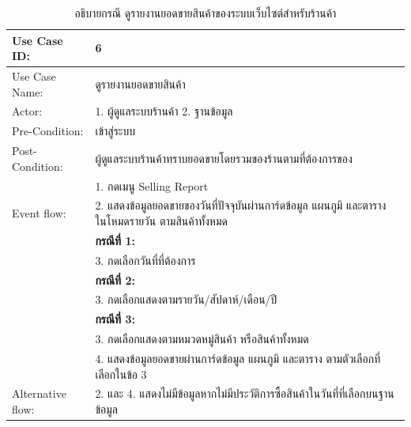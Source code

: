 \begin{table}[htbp]
  \centering
  \caption{อธิบายกรณี ดูรายงานยอดขายสินค้าของระบบเว็บไซต์สำหรับร้านค้า}
  \begin{tabularx}{\textwidth}{|p{3cm}|X|}
    \hline
    \multirow{1}{3cm}{Use Case ID:}      & 6                                                                               \\
    \hline
    \multirow{1}{3cm}{Use Case Name:}    & ดูรายงานยอดขายสินค้า                                                               \\
    \hline
    \multirow{1}{3cm}{Actor:}            & 1. ผู้ดูแลระบบร้านค้า  2. ฐานข้อมูล                                                    \\
    \hline
    \multirow{1}{3cm}{Pre-Condition:}    & เข้าสู่ระบบ                                                                        \\
    \hline
    \multirow{1}{3cm}{Post-Condition:}   & ผู้ดูแลระบบร้านค้าทราบยอดขายโดยรวมของร้านตามที่ต้องการของ                                \\
    \hline
    \multirow{3}{3cm}{Event flow:}       & 1. กดเมนู Selling Report                                                         \\
                                         & 2. แสดงข้อมูลยอดขายของวันที่ปัจจุบันผ่านการ์ดข้อมูล แผนภูมิ และตาราง ในโหมดรายวัน ตามสินค้าทั้งหมด \\
                                         & \textbf{กรณีที่ 1:}                                                                \\ & 3. กดเลือกวันที่ที่ต้องการ \\
                                         & \textbf{กรณีที่ 2:}                                                                \\ & 3. กดเลือกแสดงตามรายวัน/สัปดาห์/เดือน/ปี \\
                                         & \textbf{กรณีที่ 3:}                                                                \\ & 3. กดเลือกแสดงตามหมวดหมู่สินค้า หรือสินค้าทั้งหมด \\
                                         & 4. แสดงข้อมูลยอดขายผ่านการ์ดข้อมูล แผนภูมิ และตาราง ตามตัวเลือกที่เลือกในข้อ 3                \\
    \hline
    \multirow{1}{3cm}{Alternative flow:} & 2. และ 4. แสดงไม่มีข้อมูลหากไม่มีประวัติการซื้อสินค้าในวันที่ที่เลือกบนฐานข้อมูล                    \\
    \hline
  \end{tabularx}
\end{table}

